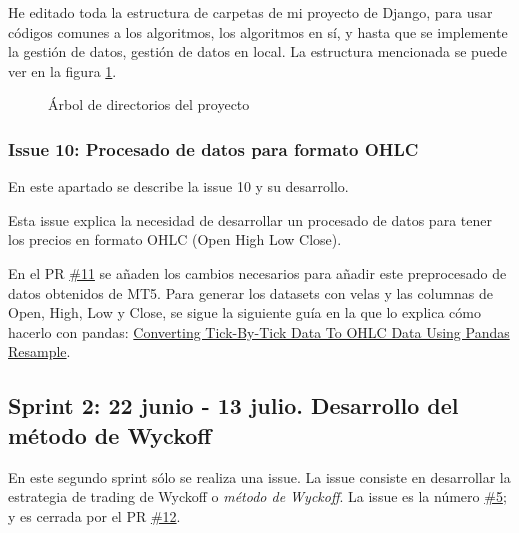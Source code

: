 He editado toda la estructura de carpetas de mi proyecto de Django, para usar códigos comunes a los algoritmos, los algoritmos en sí, y hasta que se implemente la gestión de datos, gestión de datos en local. La estructura mencionada se puede ver en la figura \ref{tree}. \newline

\begin{figure}[!h]

\caption{Árbol de directorios del proyecto} \label{tree}
\end{figure}

\subsubsection{Issue 10: Procesado de datos para formato OHLC}

En este apartado se describe la issue 10 y su desarrollo.\newline

Esta issue explica la necesidad de desarrollar un procesado de datos para tener los precios en formato OHLC (Open High Low Close). \newline

En el PR \href{https://github.com/mcarmona99/TFG/pull/11}{\#11} se añaden los cambios necesarios para añadir este preprocesado de datos obtenidos de MT5. Para generar los datasets con velas y las columnas de Open, High, Low y Close, se sigue la siguiente guía en la que lo explica cómo hacerlo con pandas: \href{https://blog.quantinsti.com/tick-tick-ohlc-data-pandas-tutorial/?utm_campaign=News&utm_medium=Community&utm_source=DataCamp.com}{Converting Tick-By-Tick Data To OHLC Data Using Pandas Resample}.\newline


\subsection{Sprint 2: 22 junio - 13 julio. Desarrollo del método de Wyckoff}

En este segundo sprint sólo se realiza una issue. La issue consiste en desarrollar la estrategia de trading de Wyckoff o \textit{método de Wyckoff}. La issue es la número \href{https://github.com/mcarmona99/TFG/issues/5}{\#5}; y es cerrada por el PR \href{https://github.com/mcarmona99/TFG/pull/12}{\#12}.\newline

